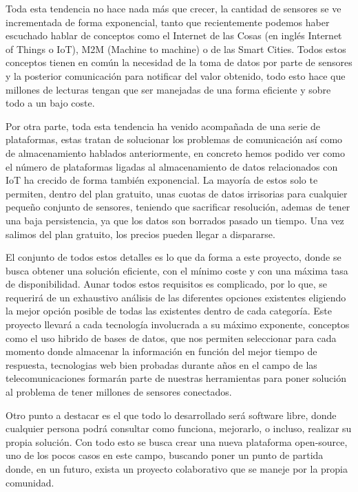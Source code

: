 Toda esta tendencia no hace nada más que crecer, la cantidad de
sensores se ve incrementada de forma exponencial, tanto que recientemente
podemos haber escuchado hablar de conceptos como el Internet de las Cosas (en
inglés Internet of Things o \acs{IoT}), \acs{M2M} (Machine to machine) o de las Smart
Cities. Todos estos
conceptos tienen en común la necesidad de la toma de datos por parte de sensores
y la posterior comunicación para notificar del valor obtenido, todo esto hace
que millones de lecturas tengan que ser manejadas de una forma eficiente y sobre todo
a un bajo coste.

\newpage
Por otra parte, toda esta tendencia ha venido acompañada de una serie de
plataformas, estas tratan de solucionar los problemas de comunicación así como
de almacenamiento hablados anteriormente, en concreto hemos podido ver como el número de plataformas ligadas al almacenamiento de datos relacionados con \acs{IoT} ha crecido de forma también exponencial.
La mayoría de estos solo te permiten, dentro del plan gratuito, unas cuotas de
datos irrisorias para cualquier pequeño conjunto de sensores, teniendo que
sacrificar resolución, ademas de tener una baja persistencia, ya que los datos son borrados pasado un tiempo. Una vez salimos del plan gratuito, los precios pueden llegar a dispararse.

El conjunto de todos estos detalles es lo que da forma a este proyecto, donde se
busca obtener una solución eficiente, con el mínimo coste y con una máxima tasa
de disponibilidad. Aunar todos estos requisitos es
complicado, por lo que, se requerirá de un exhaustivo análisis de las diferentes
opciones existentes eligiendo la mejor opción posible de todas las existentes
dentro de cada categoría. Este proyecto llevará a cada tecnología involucrada a
su máximo exponente, conceptos como el uso hibrido de bases de datos, que nos
permiten seleccionar para cada momento donde almacenar la información en función
del mejor tiempo de respuesta,
tecnologias web bien probadas durante años en el campo de las telecomunicaciones
formarán parte de nuestras herramientas para poner solución al problema de tener millones de
sensores conectados.

Otro punto a destacar es el que todo lo desarrollado será software libre, donde
cualquier persona podrá consultar como funciona, mejorarlo, o incluso, realizar
su propia solución. Con todo esto se busca crear una nueva plataforma
open-source, uno de los pocos casos en este campo, buscando poner un punto de
partida donde, en un futuro, exista un proyecto colaborativo que se maneje por
la propia comunidad.

